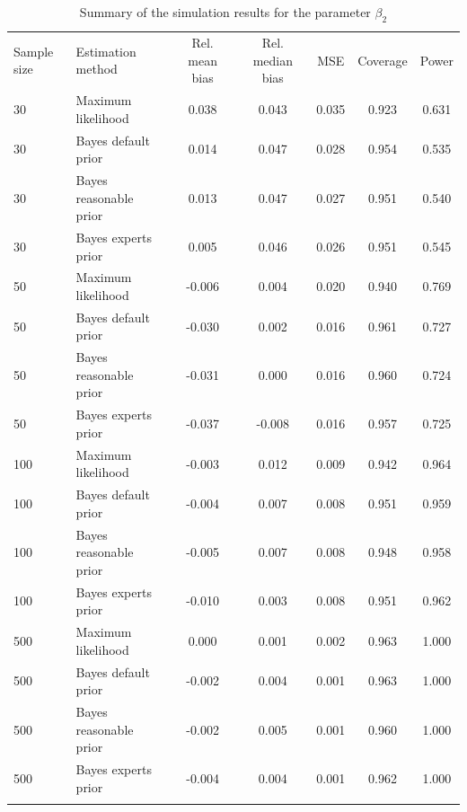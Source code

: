 \documentclass[graybox]{svmult}
\begin{document}
\begin{table}
\caption{Summary of the simulation results for the parameter $\beta_2$}
\begin{tabular}[t]{llccccc}
\hline\noalign{\smallskip}
Sample size & Estimation method & Rel. mean bias & Rel. median bias & MSE & Coverage & Power\\
\noalign{\smallskip}\svhline\noalign{\smallskip}
30 & Maximum likelihood & 0.038 & 0.043 & 0.035 & 0.923 & 0.631\\
30 & Bayes default prior & 0.014 & 0.047 & 0.028 & 0.954 & 0.535\\
30 & Bayes reasonable prior & 0.013 & 0.047 & 0.027 & 0.951 & 0.540\\
30 & Bayes experts prior & 0.005 & 0.046 & 0.026 & 0.951 & 0.545\\
\noalign{\smallskip}
50 & Maximum likelihood & -0.006 & 0.004 & 0.020 & 0.940 & 0.769\\
50 & Bayes default prior & -0.030 & 0.002 & 0.016 & 0.961 & 0.727\\
50 & Bayes reasonable prior & -0.031 & 0.000 & 0.016 & 0.960 & 0.724\\
50 & Bayes experts prior & -0.037 & -0.008 & 0.016 & 0.957 & 0.725\\
\noalign{\smallskip}
100 & Maximum likelihood & -0.003 & 0.012 & 0.009 & 0.942 & 0.964\\
100 & Bayes default prior & -0.004 & 0.007 & 0.008 & 0.951 & 0.959\\
100 & Bayes reasonable prior & -0.005 & 0.007 & 0.008 & 0.948 & 0.958\\
100 & Bayes experts prior & -0.010 & 0.003 & 0.008 & 0.951 & 0.962\\
\noalign{\smallskip}
500 & Maximum likelihood & 0.000 & 0.001 & 0.002 & 0.963 & 1.000\\
500 & Bayes default prior & -0.002 & 0.004 & 0.001 & 0.963 & 1.000\\
500 & Bayes reasonable prior & -0.002 & 0.005 & 0.001 & 0.960 & 1.000\\
500 & Bayes experts prior & -0.004 & 0.004 & 0.001 & 0.962 & 1.000\\
\noalign{\smallskip}\hline\noalign{\smallskip}
\end{tabular}
\end{table}
\end{document}
